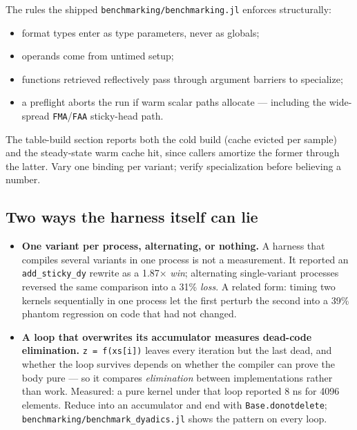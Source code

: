 \label{5346814332251914868}{}


The rules the shipped \texttt{benchmarking/\allowbreak{}benchmarking.jl} enforces structurally:



\begin{itemize}
\item format types enter as type parameters, never as globals;


\item operands come from untimed setup;


\item functions retrieved reflectively pass through argument barriers to specialize;


\item a preflight aborts the run if warm scalar paths allocate — including the wide-spread \texttt{FMA}/\allowbreak\texttt{FAA} sticky-head path.

\end{itemize}


The table-build section reports both the cold build (cache evicted per sample) and the steady-state warm cache hit, since callers amortize the former through the latter. Vary one binding per variant; verify specialization before believing a number.



\subsection{Two ways the harness itself can lie}



\label{10395984100173435142}{}


\begin{itemize}
\item \textbf{One variant per process, alternating, or nothing.} A harness that compiles several variants in one process is not a measurement. It reported an \texttt{add\_\allowbreak{}sticky\_\allowbreak{}dy} rewrite as a 1.87× \emph{win}; alternating single-variant processes reversed the same comparison into a 31\% \emph{loss}. A related form: timing two kernels sequentially in one process let the first perturb the second into a 39\% phantom regression on code that had not changed.


\item \textbf{A loop that overwrites its accumulator measures dead-code elimination.} \texttt{z = f(xs[i])} leaves every iteration but the last dead, and whether the loop survives depends on whether the compiler can prove the body pure — so it compares \emph{elimination} between implementations rather than work. Measured: a pure kernel under that loop reported 8 ns for 4096 elements. Reduce into an accumulator and end with \texttt{Base.donotdelete}; \texttt{benchmarking/\allowbreak{}benchmark\_\allowbreak{}dyadics.jl} shows the pattern on every loop.

\end{itemize}


